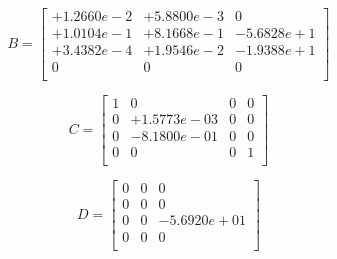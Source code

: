 \documentclass[12pt]{article}
\begin{document}
\begin{equation*}
B =
\begin{bmatrix}
  +1.2660e-2 & +5.8800e-3 &          0 \\
  +1.0104e-1 & +8.1668e-1 & -5.6828e+1 \\
  +3.4382e-4 & +1.9546e-2 & -1.9388e+1 \\
           0 &          0 &          0 \\
\end{bmatrix}
\end{equation*}

\begin{equation*}
C =
\begin{bmatrix}
   1 &           0 & 0 & 0 \\
   0 & +1.5773e-03 & 0 & 0 \\
   0 & -8.1800e-01 & 0 & 0 \\
   0 &           0 & 0 & 1 \\
\end{bmatrix}
\end{equation*}

\begin{equation*}
D =
\begin{bmatrix}
   0 & 0 &           0 \\
   0 & 0 &           0 \\
   0 & 0 & -5.6920e+01 \\
   0 & 0 &           0 \\
\end{bmatrix}
\end{equation*}


 
% 
\end{document}
